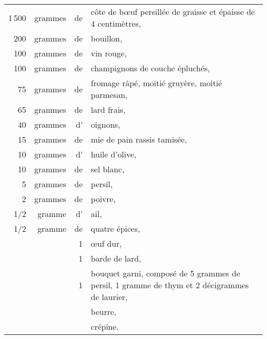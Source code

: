 \footnotesize
\begin{longtable}{rrrp{16em}}
  1 500 & grammes & de & côte de bœuf persillée de graisse et épaisse de 4 centimètres,                   \\
    200 & grammes & de & bouillon,                                                                        \\
    100 & grammes & de & vin rouge,                                                                       \\
    100 & grammes & de & champignons de couche épluchés,                                                  \\
     75 & grammes & de & fromage râpé, moitié gruyère, moitié parmesan,                                   \\
     65 & grammes & de & lard frais,                                                                      \\
     40 & grammes & d' & oignons,                                                                         \\
     15 & grammes & de & mie de pain rassis tamisée,                                                      \\
     10 & grammes & d' & huile d'olive,                                                                   \\
     10 & grammes & de & sel blanc,                                                                       \\
      5 & grammes & de & persil,                                                                          \\
      2 & grammes & de & poivre,                                                                          \\
     1/2&  gramme & d’ & ail,                                                                             \\
     1/2&  gramme & de & quatre épices,                                                                   \\
        &         &  1 & œuf dur,                                                                         \\
        &         &  1 & barde de lard,                                                                   \\
        &         &  1 & bouquet garni, composé de 5 grammes de persil,
                         1 gramme de thym et 2 décigrammes de laurier,                                    \\
        &         &    & beurre,                                                                          \\
        &         &    & crépine.                                                                         \\
\end{longtable}
\normalsize

